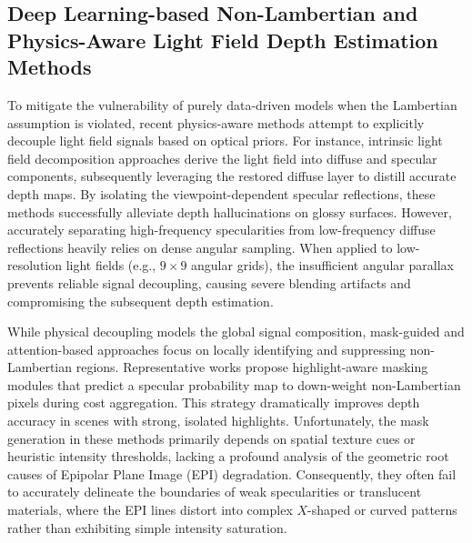 \documentclass[lettersize,journal]{IEEEtran}
\begin{document}
\subsection{Deep Learning-based Non-Lambertian and Physics-Aware Light Field Depth Estimation Methods}

To mitigate the vulnerability of purely data-driven models when the Lambertian assumption is violated, recent physics-aware methods attempt to explicitly decouple light field signals based on optical priors. For instance, intrinsic light field decomposition approaches \cite{intrinsic_light_field,signal_decoupling,physics_aware_depth} derive the light field into diffuse and specular components, subsequently leveraging the restored diffuse layer to distill accurate depth maps. By isolating the viewpoint-dependent specular reflections, these methods successfully alleviate depth hallucinations on glossy surfaces. However, accurately separating high-frequency specularities from low-frequency diffuse reflections heavily relies on dense angular sampling. When applied to low-resolution light fields (e.g., $9 \times 9$ angular grids), the insufficient angular parallax prevents reliable signal decoupling, causing severe blending artifacts and compromising the subsequent depth estimation.

While physical decoupling models the global signal composition, mask-guided and attention-based approaches focus on locally identifying and suppressing non-Lambertian regions. Representative works \cite{highlight_mask,specular_attention,non_Lambertian_depth} propose highlight-aware masking modules that predict a specular probability map to down-weight non-Lambertian pixels during cost aggregation. This strategy dramatically improves depth accuracy in scenes with strong, isolated highlights. Unfortunately, the mask generation in these methods primarily depends on spatial texture cues or heuristic intensity thresholds, lacking a profound analysis of the geometric root causes of Epipolar Plane Image (EPI) degradation. Consequently, they often fail to accurately delineate the boundaries of weak specularities or translucent materials, where the EPI lines distort into complex $X$-shaped or curved patterns rather than exhibiting simple intensity saturation.
\end{document}
